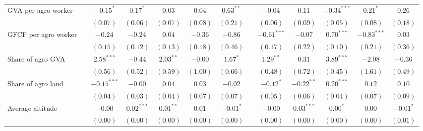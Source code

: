 \begin{table}
\begin{center}
\begin{tabular}{l c c c c c c c c c c c c}
GVA per agro worker               &               & $-0.15^{*}$   & $0.17^{*}$    & $0.03$         & $0.04$         & $0.63^{**}$   &               & $-0.04$       & $0.11$        & $-0.34^{***}$  & $0.21^{*}$    & $0.26$         \\
                                  &               & $(0.07)$      & $(0.06)$      & $(0.07)$       & $(0.08)$       & $(0.21)$      &               & $(0.06)$      & $(0.09)$      & $(0.05)$       & $(0.08)$      & $(0.18)$       \\
GFCF per agro worker              &               & $-0.24$       & $-0.24$       & $0.04$         & $-0.36$        & $-0.86$       &               & $-0.61^{***}$ & $-0.07$       & $0.70^{***}$   & $-0.83^{***}$ & $0.03$         \\
                                  &               & $(0.15)$      & $(0.12)$      & $(0.13)$       & $(0.18)$       & $(0.46)$      &               & $(0.17)$      & $(0.22)$      & $(0.10)$       & $(0.21)$      & $(0.36)$       \\
Share of agro GVA                 &               & $2.58^{***}$  & $-0.44$       & $2.03^{**}$    & $-0.00$        & $1.67^{*}$    &               & $1.29^{**}$   & $0.31$        & $3.89^{***}$   & $-2.08$       & $-0.36$        \\
                                  &               & $(0.56)$      & $(0.52)$      & $(0.59)$       & $(1.00)$       & $(0.66)$      &               & $(0.48)$      & $(0.72)$      & $(0.45)$       & $(1.61)$      & $(0.49)$       \\
Share of agro land                &               & $-0.15^{***}$ & $-0.00$       & $0.04$         & $0.03$         & $-0.02$       &               & $-0.12^{*}$   & $-0.22^{**}$  & $0.20^{***}$   & $0.12$        & $0.10$         \\
                                  &               & $(0.04)$      & $(0.03)$      & $(0.04)$       & $(0.07)$       & $(0.07)$      &               & $(0.05)$      & $(0.06)$      & $(0.04)$       & $(0.07)$      & $(0.09)$       \\
Average altitude                  &               & $-0.00$       & $0.02^{***}$  & $0.01^{**}$    & $0.01$         & $-0.01^{*}$   &               & $-0.00$       & $0.03^{***}$  & $0.00^{*}$     & $0.00$        & $-0.01^{*}$    \\
                                  &               & $(0.00)$      & $(0.00)$      & $(0.00)$       & $(0.00)$       & $(0.00)$      &               & $(0.00)$      & $(0.00)$      & $(0.00)$       & $(0.00)$      & $(0.01)$       \\

\end{tabular}
\end{center}
\end{table}
